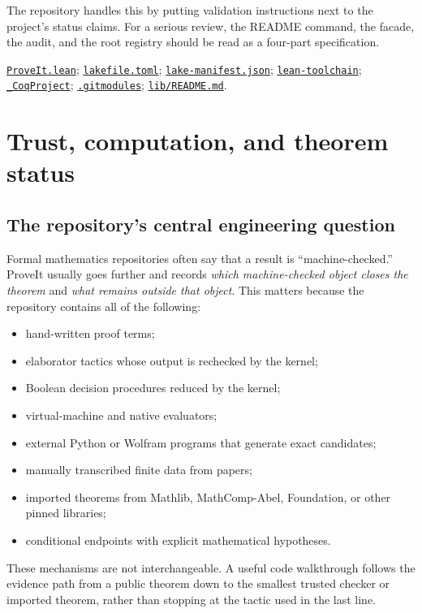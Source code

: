 \documentclass[
  10pt,
  a4paper,
  twoside,
  open=any,
  parskip=half,
  headings=big
]{scrreprt}
\newcommand{\CommitFull}{675d0a2ff0fc624fba199e006049016ba806f40a}
\newcommand{\RepoBlobBase}{https://github.com/VladimirReshetnikov/ProveIt/blob/\CommitFull/}
\newcommand{\RepoFile}[1]{%
  \href{\RepoBlobBase\detokenize{#1}}{\nolinkurl{#1}}}
\begin{document}
The repository handles this by putting validation instructions next to the
project's status claims.  For a serious review, the README command, the facade,
the audit, and the root registry should be read as a four-part specification.

\begin{sourcebox}
\RepoFile{ProveIt.lean};
\RepoFile{lakefile.toml};
\RepoFile{lake-manifest.json};
\RepoFile{lean-toolchain};
\RepoFile{_CoqProject};
\RepoFile{.gitmodules};
\RepoFile{lib/README.md}.
\end{sourcebox}

\chapter{Trust, computation, and theorem status}
\label{chap:trust}

\section{The repository's central engineering question}

Formal mathematics repositories often say that a result is
``machine-checked.''  ProveIt usually goes further and records
\emph{which machine-checked object closes the theorem} and \emph{what remains
outside that object}.  This matters because the repository contains all of
the following:

\begin{itemize}
  \item hand-written proof terms;
  \item elaborator tactics whose output is rechecked by the kernel;
  \item Boolean decision procedures reduced by the kernel;
  \item virtual-machine and native evaluators;
  \item external Python or Wolfram programs that generate exact candidates;
  \item manually transcribed finite data from papers;
  \item imported theorems from Mathlib, MathComp-Abel, Foundation, or other
        pinned libraries;
  \item conditional endpoints with explicit mathematical hypotheses.
\end{itemize}

These mechanisms are not interchangeable.  A useful code walkthrough follows
the evidence path from a public theorem down to the smallest trusted checker
or imported theorem, rather than stopping at the tactic used in the last line.
\end{document}
